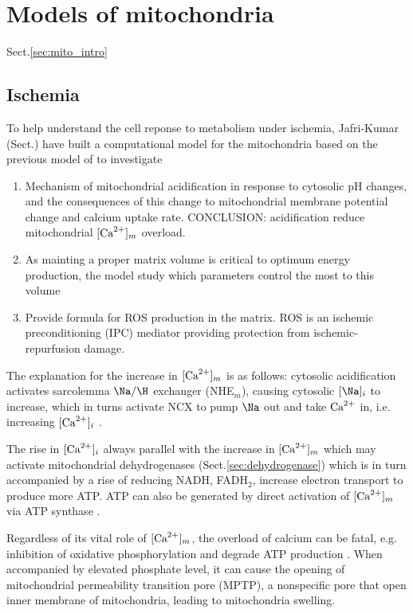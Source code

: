 \chapter{Models of mitochondria}
\label{chap:mitochondria-cardiac-models}

Sect.\ref{sec:mito_intro}


\section{Ischemia}
\label{sec:heartdisease_ischemia}

To help understand the cell reponse to metabolism under ischemia,
Jafri-Kumar (Sect.\citep{jafri2014}) have built a computational model for the
mitochondria based on the previous model of \citep{abc} to investigate
\begin{enumerate}
  \item Mechanism of mitochondrial acidification in response to cytosolic pH
  changes, and the consequences of this change to mitochondrial membrane
  potential change and calcium uptake rate. CONCLUSION: acidification reduce
  mitochondrial $[{\text{Ca}^{2+}}]_m$ overload.
  \item As mainting a proper matrix volume is critical to optimum energy
  production, the model study which parameters control the most to this volume

  \item Provide formula for ROS production in the matrix. ROS is an ischemic
  preconditioning (IPC) mediator providing protection from ischemic-repurfusion
  damage.
\end{enumerate}

The explanation for the increase in $[{\text{Ca}^{2+}}]_m$ is as follows: cytosolic
acidification activates sarcolemma $\Na/\H$ exchanger (NHE$_m$), causing
cytosolic $[\Na]_i$ to increase, which in turns activate NCX to pump $\Na$
out and take ${\text{Ca}^{2+}}$ in, i.e. increasing $[{\text{Ca}^{2+}}]_i$ \citep{orourke2005}.

The rise in $[{\text{Ca}^{2+}}]_i$ always parallel with the increase in $[{\text{Ca}^{2+}}]_m$
\citep{gurshani2004} which may activate mitochondrial dehydrogenases
(Sect.\ref{sec:dehydrogenase}) which is in turn accompanied by a rise of
reducing NADH, FADH$_2$, increase electron transport to produce more
ATP\citep{mccormack1990}. ATP can also be generated by direct activation of
$[{\text{Ca}^{2+}}]_m$ via ATP synthase \citep{territo2000}.

Regardless of its vital role of $[{\text{Ca}^{2+}}]_m$, the overload of calcium can be fatal,
e.g. inhibition of oxidative phosphorylation and degrade ATP production
\citep{kovacs2005}. When accompanied by elevated phosphate level, it can cause the
opening of mitochondrial permeability transition pore (MPTP), a nonspecific pore that
open inner membrane of mitochondria, leading to mitochondria swelling.

